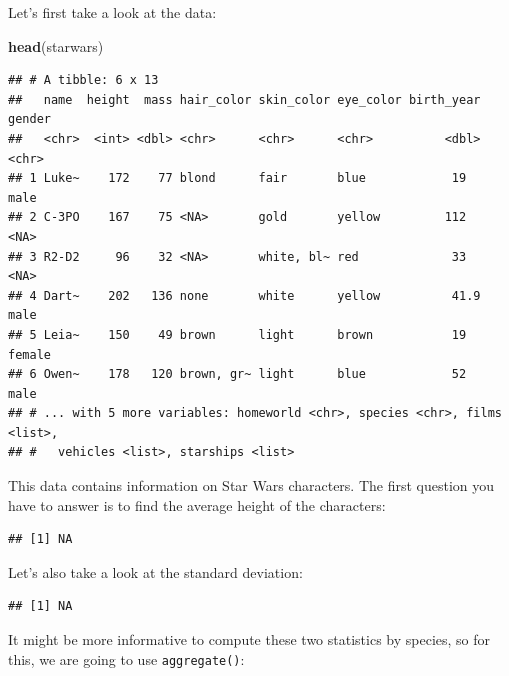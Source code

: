 \documentclass[]{gitbook}
\newenvironment{Shaded}{\begin{snugshade}}{\end{snugshade}}
\newcommand{\KeywordTok}[1]{\textcolor[rgb]{0.13,0.29,0.53}{\textbf{#1}}}
\newcommand{\NormalTok}[1]{#1}
\newcommand{\OperatorTok}[1]{\textcolor[rgb]{0.81,0.36,0.00}{\textbf{#1}}}
\begin{document}
Let's first take a look at the data:

\begin{Shaded}
\begin{Highlighting}[]
\KeywordTok{head}\NormalTok{(starwars)}
\end{Highlighting}
\end{Shaded}

\begin{verbatim}
## # A tibble: 6 x 13
##   name  height  mass hair_color skin_color eye_color birth_year gender
##   <chr>  <int> <dbl> <chr>      <chr>      <chr>          <dbl> <chr> 
## 1 Luke~    172    77 blond      fair       blue            19   male  
## 2 C-3PO    167    75 <NA>       gold       yellow         112   <NA>  
## 3 R2-D2     96    32 <NA>       white, bl~ red             33   <NA>  
## 4 Dart~    202   136 none       white      yellow          41.9 male  
## 5 Leia~    150    49 brown      light      brown           19   female
## 6 Owen~    178   120 brown, gr~ light      blue            52   male  
## # ... with 5 more variables: homeworld <chr>, species <chr>, films <list>,
## #   vehicles <list>, starships <list>
\end{verbatim}

This data contains information on Star Wars characters. The first question you have to answer is
to find the average height of the characters:

\begin{Shaded}
\end{Shaded}

\begin{verbatim}
## [1] NA
\end{verbatim}

Let's also take a look at the standard deviation:

\begin{Shaded}
\end{Shaded}

\begin{verbatim}
## [1] NA
\end{verbatim}

It might be more informative to compute these two statistics by species, so for this, we are going
to use \texttt{aggregate()}:
\end{document}
